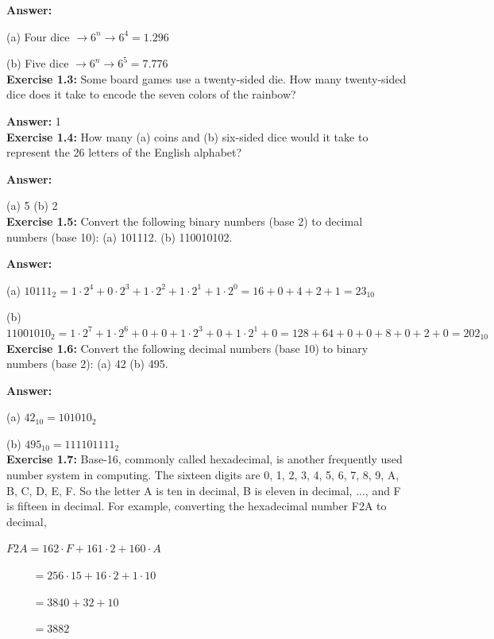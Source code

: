 \documentclass[12pt]{article}
\begin{document}
\textbf{Answer:}

(a) Four dice \(\rightarrow 6^{n} \rightarrow 6^{4} = 1.296\)

(b) Five dice \(\rightarrow 6^{n} \rightarrow 6^{5} = 7.776\)\\

\textbf{Exercise 1.3:} Some board games use a twenty-sided die. How many twenty-sided dice does it take to encode the seven colors of the rainbow?

\textbf{Answer:} 1\\

\textbf{Exercise 1.4:} How many (a) coins and (b) six-sided dice would it take to represent the 26 letters of the English alphabet?

\textbf{Answer:}

(a) 5
(b) 2\\

\textbf{Exercise 1.5:} Convert the following binary numbers (base 2) to decimal numbers (base 10): (a) 101112. (b) 110010102.

\textbf{Answer:}

(a) \(10111_{2} = 1 \cdot 2^{4} + 0 \cdot 2^{3} + 1 \cdot 2^{2} + 1 \cdot 2^{1} + 1 \cdot 2^{0} = 16 + 0 + 4 + 2 + 1 = 23_{10} \)

(b) \(11001010_{2} = 1 \cdot 2^{7} + 1 \cdot 2^{6} + 0 + 0 + 1 \cdot 2^{3} + 0 + 1 \cdot 2^{1} + 0 = 128 + 64 + 0 + 0 + 8 + 0 + 2 + 0 = 202_{10}\)\\

\textbf{Exercise 1.6:} Convert the following decimal numbers (base 10) to binary numbers (base 2): (a) 42 (b) 495.

\textbf{Answer:}

(a) \(42_{10} = 101010_{2}\)

(b) \(495_{10} = 111101111_{2}\)\\

\textbf{Exercise 1.7:} Base-16, commonly called hexadecimal, is another frequently used number system in computing. The sixteen digits are 0, 1, 2, 3, 4, 5, 6, 7, 8, 9, A, B, C, D, E, F. So the letter A is ten in decimal, B is eleven in decimal, ..., and F is fifteen in decimal. For example, converting the hexadecimal number F2A to decimal,

\(F2A = 162 \cdot F + 161 \cdot 2 + 160 \cdot A\)

\(\quad\quad\,\,= 256 \cdot 15 + 16 \cdot 2 + 1 \cdot 10\)

\(\quad\quad\,\,= 3840 + 32 + 10\)

\(\quad\quad\,\,= 3882\)
\end{document}
